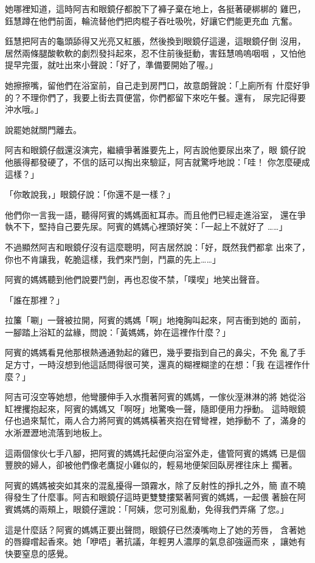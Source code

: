 她哪裡知道，這時阿吉和眼鏡仔都脫下了褲子棄在地上，各挺著硬梆梆的
雞巴，鈺慧蹲在他們前面，輪流替他們把肉棍子吞吐吸吮，好讓它們能更充血
亢奮。

鈺慧把阿吉的龜頭舔得又光亮又紅脹，然後換到眼鏡仔這邊，這眼鏡仔倒
沒用，居然兩條腿酸軟軟的劇烈發抖起來，忍不住前後挺動，害鈺慧嗚嗚咽咽
，又怕他提早完蛋，就吐出來小聲說：「好了，準備要開始了喔。」

她擦擦嘴，留他們在浴室前，自己走到房門口，故意朗聲說：「上廁所有
什麼好爭的？不理你們了，我要上街去買便當，你們都留下來吃午餐。還有，
尿完記得要沖水哦。」

說罷她就關門離去。

阿吉和眼鏡仔戲還沒演完，繼續爭著誰要先上，阿吉說他要尿出來了，眼
鏡仔說他脹得都發硬了，不信的話可以掏出來驗証，阿吉就驚呼地說：「哇！
你怎麼硬成這樣？」

「你敢說我，」眼鏡仔說：「你還不是一樣？」

他們你一言我一語，聽得阿賓的媽媽面紅耳赤。而且他們已經走進浴室，
還在爭執不下，堅持自己要先尿。阿賓的媽媽心裡頭好笑：「一起上不就好了
……」

不過顯然阿吉和眼鏡仔沒有這麼聰明，阿吉居然說：「好，既然我們都拿
出來了，你也不肯讓我，乾脆這樣，我們來鬥劍，鬥贏的先上……」

阿賓的媽媽聽到他們說要鬥劍，再也忍俊不禁，「噗喫」地笑出聲音。

「誰在那裡？」

拉簾「唰」一聲被拉開，阿賓的媽媽「啊」地掩胸叫起來，阿吉衝到她的
面前，一腳踏上浴缸的盆緣，問說：「黃媽媽，妳在這裡作什麼？」

阿賓的媽媽看見他那根熱通通勃起的雞巴，幾乎要指到自己的鼻尖，不免
亂了手足方寸，一時沒想到他這話問得很可笑，還真的糊裡糊塗的在想：「我
在這裡作什麼？」

阿吉可沒空等她想，他彎腰伸手入水攬著阿賓的媽媽，一傢伙溼淋淋的將
她從浴缸裡攫抱起來，阿賓的媽媽又「啊呀」地驚喚一聲，隨即便用力掙動。
這時眼鏡仔也過來幫忙，兩人合力將阿賓的媽媽橫著夾抱在臂彎裡，她掙動不
了，滿身的水淅瀝瀝地流落到地板上。

這兩個傢伙七手八腳，把阿賓的媽媽托起便向浴室外走，儘管阿賓的媽媽
已是個豐腴的婦人，卻被他們像老鷹捉小雞似的，輕易地便架回臥房裡往床上
擱著。

阿賓的媽媽被突如其來的混亂擾得一頭霧水，除了反射性的掙扎之外，簡
直不曉得發生了什麼事。阿吉和眼鏡仔這時更雙雙摟緊著阿賓的媽媽，一起偎
著臉在阿賓媽媽的兩頰上，眼鏡仔還說：「阿姨，您可別亂動，免得我們弄痛
了您。」

這是什麼話？阿賓的媽媽正要出聲問，眼鏡仔已然湊嘴吻上了她的芳唇，
含著她的唇瓣嚐起香來。她「咿唔」著抗議，年輕男人濃厚的氣息卻強逼而來
，讓她有快要窒息的感覺。

